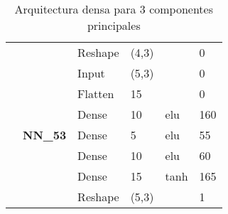 \begin{table}[H]
\begin{center}
\begin{tabular}{ll|l|l|l|l|}
\multicolumn{1}{|l|}{}                                                                       &                                  & Reshape                            & (4,3)                                &                                          & 0                                           \\ \cline{2-6} 
\multicolumn{1}{|l|}{}                                                                       & \multirow{7}{*}{\textbf{NN\_53}} & Input                              & (5,3)                                &                                          & 0                                           \\ \cline{3-6} 
\multicolumn{1}{|l|}{}                                                                       &                                  & Flatten                            & 15                                   &                                          & 0                                           \\ \cline{3-6} 
\multicolumn{1}{|l|}{}                                                                       &                                  & Dense                              & 10                                   & elu                                     & 160                                         \\ \cline{3-6} 
\multicolumn{1}{|l|}{}                                                                       &                                  & Dense                              & 5                                    & elu                                     & 55                                          \\ \cline{3-6} 
\multicolumn{1}{|l|}{}                                                                       &                                  & Dense                              & 10                                   & elu                                     & 60                                          \\ \cline{3-6} 
\multicolumn{1}{|l|}{}                                                                       &                                  & Dense                              & 15                                   & tanh                                     & 165                                         \\ \cline{3-6} 
\multicolumn{1}{|l|}{}                                                                       &                                  & Reshape                            & (5,3)                                &                                          & 1                                           \\ \hline
\end{tabular}
\end{center}
\caption{Arquitectura densa para 3 componentes principales}
\label{table:nn_3}
\end{table}

